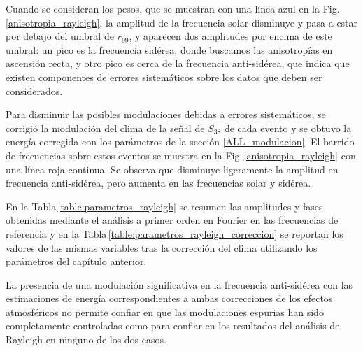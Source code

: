 Cuando se consideran los pesos, que se muestran con una línea azul en la Fig. \ref{anisotropia_rayleigh}, la amplitud de la frecuencia solar disminuye y pasa a estar por debajo del umbral de $r_{99}$, y aparecen dos amplitudes por encima de este umbral: un pico es la frecuencia sidérea, donde buscamos las anisotropías en ascensión recta, y otro pico es cerca de la frecuencia anti-sidérea, que indica que existen componentes de errores sistemáticos sobre los datos que deben ser considerados. 

Para disminuir las posibles modulaciones debidas a errores sistemáticos, se corrigió la modulación del clima de la  señal de $S_{38}$ de cada evento y se obtuvo la energía corregida con los parámetros de la sección \ref{ALL_modulacion}. El barrido de frecuencias sobre estos eventos se muestra en la Fig.\,\ref{anisotropia_rayleigh} con una línea roja continua. Se observa que disminuye ligeramente la amplitud en frecuencia anti-sidérea, pero aumenta en las frecuencias solar y sidérea.


		
En la Tabla\,\ref{table:parametros_rayleigh} se resumen las amplitudes y fases obtenidas mediante el análisis a primer orden en Fourier en las frecuencias de referencia  y en la Tabla\,\ref{table:parametros_rayleigh_correccion} se reportan los valores de las mismas variables tras la corrección del clima utilizando los parámetros del capítulo anterior.


La presencia de una modulación significativa en la frecuencia anti-sidérea con las estimaciones de energía correspondientes a ambas correcciones de los efectos atmosféricos no permite confiar en que las modulaciones espurias han sido completamente controladas como para confiar en los resultados del análisis de Rayleigh en ninguno de los dos casos. 

